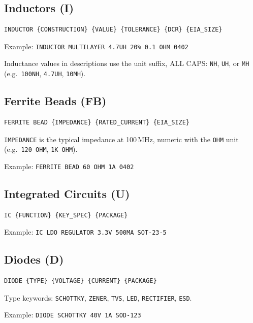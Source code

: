 \documentclass[11pt,a4paper]{article}
\begin{document}
\subsection{Inductors (I)}

\begin{verbatim}
INDUCTOR {CONSTRUCTION} {VALUE} {TOLERANCE} {DCR} {EIA_SIZE}
\end{verbatim}

Example: \texttt{INDUCTOR MULTILAYER 4.7UH 20\% 0.1 OHM 0402}

Inductance values in descriptions use the unit suffix, ALL CAPS: \texttt{NH}, \texttt{UH}, or \texttt{MH} (e.g.\ \texttt{100NH}, \texttt{4.7UH}, \texttt{10MH}).

\subsection{Ferrite Beads (FB)}

\begin{verbatim}
FERRITE BEAD {IMPEDANCE} {RATED_CURRENT} {EIA_SIZE}
\end{verbatim}

\texttt{IMPEDANCE} is the typical impedance at 100\,MHz, numeric with the \texttt{OHM} unit (e.g.\ \texttt{120 OHM}, \texttt{1K OHM}).

Example: \texttt{FERRITE BEAD 60 OHM 1A 0402}

\subsection{Integrated Circuits (U)}

\begin{verbatim}
IC {FUNCTION} {KEY_SPEC} {PACKAGE}
\end{verbatim}

Example: \texttt{IC LDO REGULATOR 3.3V 500MA SOT-23-5}

\subsection{Diodes (D)}

\begin{verbatim}
DIODE {TYPE} {VOLTAGE} {CURRENT} {PACKAGE}
\end{verbatim}

Type keywords: \texttt{SCHOTTKY}, \texttt{ZENER}, \texttt{TVS}, \texttt{LED}, \texttt{RECTIFIER}, \texttt{ESD}.

Example: \texttt{DIODE SCHOTTKY 40V 1A SOD-123}
\end{document}
